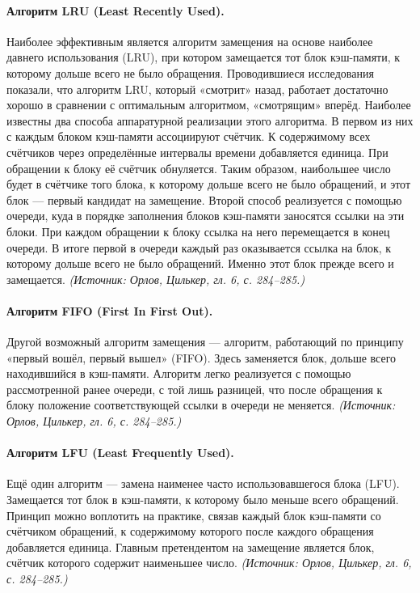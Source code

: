 \documentclass[a4paper,12pt]{article}
\begin{document}
\paragraph{Алгоритм LRU (Least Recently Used).}
Наиболее эффективным является алгоритм замещения на основе наиболее давнего использования (LRU), при котором замещается тот блок кэш-памяти, к которому дольше всего не было обращения. Проводившиеся исследования показали, что алгоритм LRU, который «смотрит» назад, работает достаточно хорошо в сравнении с оптимальным алгоритмом, «смотрящим» вперёд. Наиболее известны два способа аппаратурной реализации этого алгоритма. В первом из них с каждым блоком кэш-памяти ассоциируют счётчик. К содержимому всех счётчиков через определённые интервалы времени добавляется единица. При обращении к блоку её счётчик обнуляется. Таким образом, наибольшее число будет в счётчике того блока, к которому дольше всего не было обращений, и этот блок --- первый кандидат на замещение. Второй способ реализуется с помощью очереди, куда в порядке заполнения блоков кэш-памяти заносятся ссылки на эти блоки. При каждом обращении к блоку ссылка на него перемещается в конец очереди. В итоге первой в очереди каждый раз оказывается ссылка на блок, к которому дольше всего не было обращений. Именно этот блок прежде всего и замещается.
\textit{(Источник: Орлов, Цилькер, гл. 6, с. 284--285.)}

\paragraph{Алгоритм FIFO (First In First Out).}
Другой возможный алгоритм замещения --- алгоритм, работающий по принципу «первый вошёл, первый вышел» (FIFO). Здесь заменяется блок, дольше всего находившийся в кэш-памяти. Алгоритм легко реализуется с помощью рассмотренной ранее очереди, с той лишь разницей, что после обращения к блоку положение соответствующей ссылки в очереди не меняется.
\textit{(Источник: Орлов, Цилькер, гл. 6, с. 284--285.)}

\paragraph{Алгоритм LFU (Least Frequently Used).}
Ещё один алгоритм --- замена наименее часто использовавшегося блока (LFU). Замещается тот блок в кэш-памяти, к которому было меньше всего обращений. Принцип можно воплотить на практике, связав каждый блок кэш-памяти со счётчиком обращений, к содержимому которого после каждого обращения добавляется единица. Главным претендентом на замещение является блок, счётчик которого содержит наименьшее число.
\textit{(Источник: Орлов, Цилькер, гл. 6, с. 284--285.)}
\end{document}

